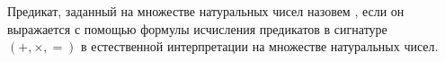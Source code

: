 Предикат, заданный на множестве натуральных чисел назовем , если он выражается с
помощью формулы исчисления предикатов в сигнатуре $(+, \times, =)$ в естественной интерпретации на
множестве натуральных чисел.
